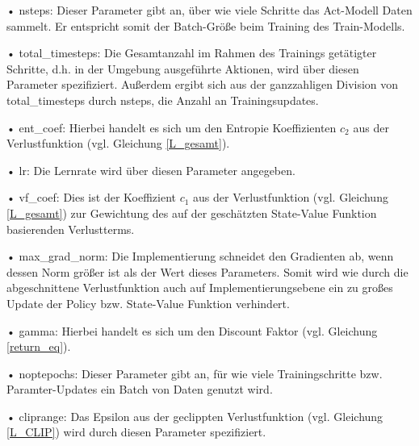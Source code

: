 \begin{description}
	\item • nsteps: Dieser Parameter gibt an, über wie viele Schritte das Act-Modell Daten sammelt. Er entspricht somit der Batch-Größe beim Training des Train-Modells.
	\item • total\_timesteps: Die Gesamtanzahl im Rahmen des Trainings getätigter Schritte, d.h. in der Umgebung ausgeführte Aktionen, wird über diesen Parameter spezifiziert. Außerdem ergibt sich aus der ganzzahligen Division von total\_timesteps durch nsteps, die Anzahl an Trainingsupdates.
	\item • ent\_coef: Hierbei handelt es sich um den Entropie Koeffizienten $c_2$ aus der Verlustfunktion (vgl. Gleichung \eqref{L_gesamt}).
	\item • lr: Die Lernrate wird über diesen Parameter angegeben.
	\item • vf\_coef: Dies ist der Koeffizient $c_1$ aus der Verlustfunktion (vgl. Gleichung \eqref{L_gesamt}) zur Gewichtung des auf der geschätzten State-Value Funktion basierenden Verlustterms.
	\item • max\_grad\_norm: Die Implementierung schneidet den Gradienten ab, wenn dessen Norm größer ist als der Wert dieses Parameters. Somit wird wie durch die abgeschnittene Verlustfunktion auch auf Implementierungsebene ein zu großes Update der Policy bzw. State-Value Funktion verhindert.
	\item • gamma: Hierbei handelt es sich um den Discount Faktor (vgl. Gleichung \eqref{return_eq}).
	\item • noptepochs: Dieser Parameter gibt an, für wie viele Trainingschritte bzw. Paramter-Updates ein Batch von Daten genutzt wird.
	\item • cliprange: Das Epsilon aus der  geclippten Verlustfunktion (vgl. Gleichung \eqref{L_CLIP}) wird durch diesen Parameter spezifiziert.
\end{description}



